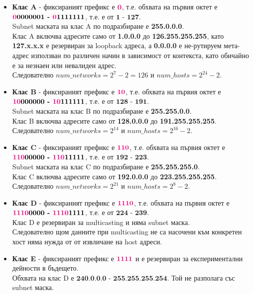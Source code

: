 \documentclass[fleqn,12pt]{article}
\begin{document}
\begin{flushleft}
\begin{itemize}
    \item \textbf{Клас A} - фиксираният префикс е $\textbf{\textcolor{RubineRed}{0}}$, т.е. обхвата на първия октет е $\textbf{\textcolor{RubineRed}{0}0000001 - \textcolor{RubineRed}{0}1111111}$, т.е. е от $\textbf{1 - 127}$. \\
    Subnet маската на клас A по подразбиране е \textbf{255.0.0.0}.\\
    Клас A включва адресите само от \textbf{1.0.0.0} до \textbf{126.255.255.255}, като \textbf{127.x.x.x} е резервиран за loopback адреса, а \textbf{0.0.0.0} е не-рутируем мета-адрес използван по различен начин в зависимост от контекста, като обичайно е за незнаен или невалиден адрес.\\
    Следователно $num\_networks = 2^7 - 2 = 126$ и $num\_hosts = 2^{24} - 2$.
    \item \textbf{Клас B} - фиксираният префикс е $\textbf{\textcolor{RubineRed}{10}}$, т.е. обхвата на първия октет е $\textbf{\textcolor{RubineRed}{10}000000 - \textcolor{RubineRed}{10}111111}$, т.е. е от $\textbf{128 - 191}$. \\
    Subnet маската на клас B по подразбиране е \textbf{255.255.0.0}.\\
    Клас B включва адресите само от \textbf{128.0.0.0} до \textbf{191.255.255.255}.\\
    Следователно $num\_networks = 2^{14}$ и $num\_hosts = 2^{16} - 2$.
    \item \textbf{Клас C} - фиксираният префикс е $\textbf{\textcolor{RubineRed}{110}}$, т.е. обхвата на първия октет е $\textbf{\textcolor{RubineRed}{110}00000 - \textcolor{RubineRed}{110}11111}$, т.е. е от $\textbf{192 - 223}$. \\
    Subnet маската на клас C по подразбиране е \textbf{255.255.255.0}.\\
    Клас C включва адресите само от \textbf{192.0.0.0} до \textbf{223.255.255.255}.\\
    Следователно $num\_networks = 2^{21}$ и $num\_hosts = 2^{8} - 2$.
    \item \textbf{Клас D} - фиксираният префикс е $\textbf{\textcolor{RubineRed}{1110}}$, т.е. обхвата на първия октет е $\textbf{\textcolor{RubineRed}{1110}0000 - \textcolor{RubineRed}{1110}1111}$, т.е. е от $\textbf{224 - 239}$. \\
    Клас D е резервиран за multicasting и няма subnet маска. \\
    Следователно щом данните при multicasting не са насочени към конкретен хост няма нужда от от извличане на host адреси.
    \item \textbf{Клас E} - фиксираният префикс е $\textbf{\textcolor{RubineRed}{1111}}$ и е резервиран за експериментални дейности в бъдещето. \\
    Обхвата на клас D е $\textbf{240.0.0.0 - 255.255.255.254}$. Той не разполага със subnet маска.
\end{itemize}


\end{flushleft}
\end{document}

